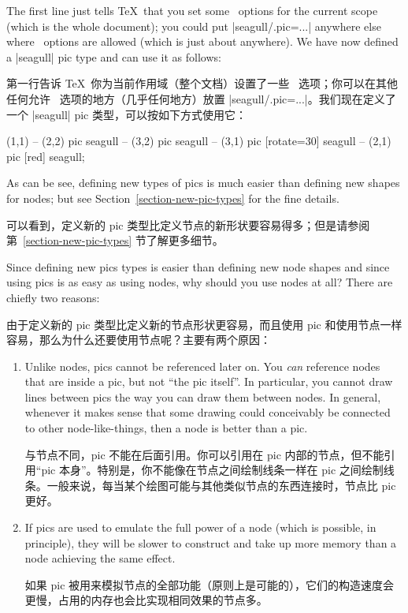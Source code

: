 The first line just tells \TeX\ that you set some \tikzname\ options for the
current scope (which is the whole document); you could put |seagull/.pic=...|
anywhere else where \tikzname\ options are allowed (which is just about
anywhere). We have now defined a |seagull| pic type and can use it as follows:

第一行告诉 \TeX\ 你为当前作用域（整个文档）设置了一些 \tikzname\ 选项；你可以在其他任何允许 \tikzname\ 选项的地方（几乎任何地方）放置 |seagull/.pic=...|。我们现在定义了一个 |seagull| pic 类型，可以按如下方式使用它：

%
\begin{codeexample}[
    pre={\tikzset{
  seagull/.pic={
    \draw (-3mm,0) to [bend left] (0,0) to [bend left] (3mm,0);
  },
}}]
\tikz \fill [fill=blue!20]
     (1,1)
  -- (2,2) pic             {seagull}
  -- (3,2) pic             {seagull}
  -- (3,1) pic [rotate=30] {seagull}
  -- (2,1) pic [red]       {seagull};
\end{codeexample}

As can be see, defining new types of pics is much easier than defining new
shapes for nodes; but see Section~\ref{section-new-pic-types} for the fine
details.

可以看到，定义新的 pic 类型比定义节点的新形状要容易得多；但是请参阅第~\ref{section-new-pic-types} 节了解更多细节。

Since defining new pics types is easier than defining new node shapes and since
using pics is as easy as using nodes, why should you use nodes at all? There
are chiefly two reasons:

由于定义新的 pic 类型比定义新的节点形状更容易，而且使用 pic 和使用节点一样容易，那么为什么还要使用节点呢？主要有两个原因：

%
\begin{enumerate}
    \item Unlike nodes, pics cannot be referenced later on. You \emph{can}
        reference nodes that are inside a pic, but not ``the pic itself''. In
        particular, you cannot draw lines between pics the way you can draw
        them between nodes. In general, whenever it makes sense that some
        drawing could conceivably be connected to other node-like-things, then
        a node is better than a pic.

        与节点不同，pic 不能在后面引用。你可以引用在 pic 内部的节点，但不能引用``pic 本身''。特别是，你不能像在节点之间绘制线条一样在 pic 之间绘制线条。一般来说，每当某个绘图可能与其他类似节点的东西连接时，节点比 pic 更好。
    \item If pics are used to emulate the full power of a node (which is
        possible, in principle), they will be slower to construct and take up
        more memory than a node achieving the same effect.

        如果 pic 被用来模拟节点的全部功能（原则上是可能的），它们的构造速度会更慢，占用的内存也会比实现相同效果的节点多。
\end{enumerate}

